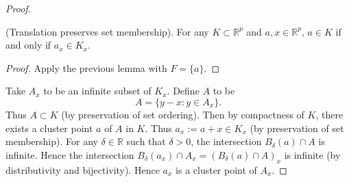 \begin{enumerate}
\begin{proof}
	\begin{corollary}(Translation preserves set membership).
		For any $K \subset \mathbb{R}^p$ and $a, x \in \mathbb{R}^p$, $a \in  K$ if and only if $a_x \in  K_x$.
	\end{corollary}
	\begin{proof}
		Apply the previous lemma with $F = \{a\}$.
	\end{proof}
	Take $A_x$ to be an infinite subset of $K_x$. Define $A$ to be \[
		A = \{y -x: y \in A_x\}
	.\] 
	Thus $A \subset K$ (by preservation of set ordering). Then by compactness of $K$, there exists a cluster point $a$ of $A$ in $K$. Thus $a_x :=a + x \in K_x$ (by preservation of set membership). For any $\delta\in \mathbb{R}$ such that $\delta>0$, the intersection $B_\delta(a) \cap A$ is infinite. 
	Hence the intersection $B_{\delta}(a_x) \cap A_x = \left( B_\delta(a) \cap A \right)_x $ is infinite (by distributivity and bijectivity). Hence $a_x$ is a cluster point of $A_x$.
\end{proof}

\end{enumerate}
